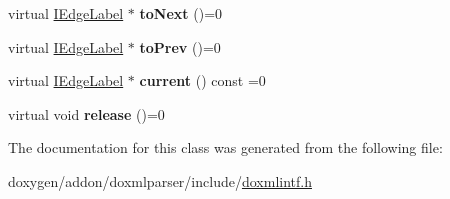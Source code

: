 \begin{DoxyCompactItemize}
\mbox{\label{class_i_edge_label_iterator_a82758e23b6c81d12c5d06406021c4c9a}} 
virtual \mbox{\hyperlink{class_i_edge_label}{I\+Edge\+Label}} $\ast$ {\bfseries to\+Next} ()=0
\item 
\mbox{\label{class_i_edge_label_iterator_ae6d84210a16d32200382eb3283cf55c9}} 
virtual \mbox{\hyperlink{class_i_edge_label}{I\+Edge\+Label}} $\ast$ {\bfseries to\+Prev} ()=0
\item 
\mbox{\label{class_i_edge_label_iterator_ad1de4fd4415bc183f03cfee0804d32d1}} 
virtual \mbox{\hyperlink{class_i_edge_label}{I\+Edge\+Label}} $\ast$ {\bfseries current} () const =0
\item 
\mbox{\label{class_i_edge_label_iterator_ab09e8bb2dd68bb836398a02456c279d3}} 
virtual void {\bfseries release} ()=0
\end{DoxyCompactItemize}


The documentation for this class was generated from the following file\+:\begin{DoxyCompactItemize}
\item 
doxygen/addon/doxmlparser/include/\mbox{\hyperlink{include_2doxmlintf_8h}{doxmlintf.\+h}}\end{DoxyCompactItemize}
